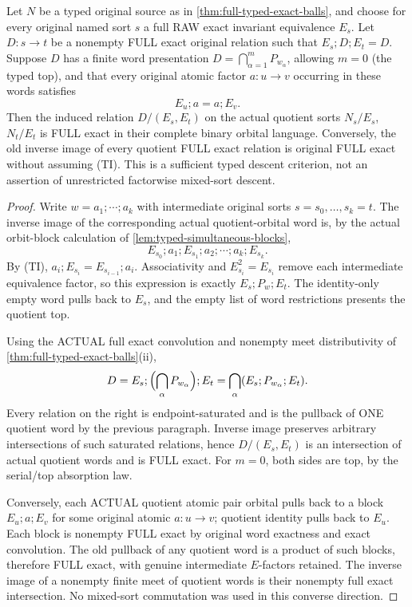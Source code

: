 \begin{lemma}
\label{lem:typed-intertwining-exact-descent}
Let $N$ be a typed original source as in
\cref{thm:full-typed-exact-balls}, and choose for every
original named sort $s$ a full RAW exact invariant
equivalence $E_s$.  Let $D:s\to t$ be a nonempty FULL
exact original relation such that $E_s;D;E_t=D$.
Suppose $D$ has a finite word presentation
$D=\bigcap_{\alpha=1}^m P_{w_\alpha}$, allowing $m=0$
(the typed top), and that every original atomic factor
$a:u\to v$ occurring in these words satisfies
\[
                       E_u;a=a;E_v.
 \tag{TI}\label{eq:typed-intertwining}
\]
Then the induced relation $D/(E_s,E_t)$ on the actual
quotient sorts $N_s/E_s$, $N_t/E_t$ is FULL exact in
their complete binary orbital language.  Conversely,
the old inverse image of every quotient FULL exact
relation is original FULL exact without assuming (TI).
This is a sufficient typed descent criterion, not an
assertion of unrestricted factorwise mixed-sort descent.
\end{lemma}
\begin{proof}
Write $w=a_1;\cdots;a_k$ with intermediate original
sorts $s=s_0,\ldots,s_k=t$.  The inverse image of
the corresponding actual quotient-orbital word is,
by the actual orbit-block calculation of
\cref{lem:typed-simultaneous-blocks},
\[
 E_{s_0};a_1;E_{s_1};a_2;\cdots;a_k;E_{s_k}.
\]
By (TI), $a_i;E_{s_i}=E_{s_{i-1}};a_i$.
Associativity and $E_{s_i}^2=E_{s_i}$ remove each
intermediate equivalence factor, so this expression is
exactly $E_s;P_w;E_t$.  The identity-only empty word
pulls back to $E_s$, and the empty list of word
restrictions presents the quotient top.

Using the ACTUAL full exact convolution and nonempty
meet distributivity of \cref{thm:full-typed-exact-balls}(ii),
\[
 D=E_s;\Bigl(\bigcap_\alpha P_{w_\alpha}\Bigr);E_t
       =\bigcap_\alpha(E_s;P_{w_\alpha};E_t).
\]
Every relation on the right is endpoint-saturated and
is the pullback of ONE quotient word by the previous
paragraph.  Inverse image preserves arbitrary
intersections of such saturated relations, hence
$D/(E_s,E_t)$ is an intersection of actual quotient
words and is FULL exact.  For $m=0$, both sides are
top, by the serial/top absorption law.

Conversely, each ACTUAL quotient atomic pair orbital
pulls back to a block $E_u;a;E_v$ for some original
atomic $a:u\to v$; quotient identity pulls back to
$E_u$.  Each block is nonempty FULL exact by original
word exactness and exact convolution.  The old pullback
of any quotient word is a product of such blocks,
therefore FULL exact, with genuine intermediate
$E$-factors retained.  The inverse image of a
nonempty finite meet of quotient words is their
nonempty full exact intersection.  No mixed-sort
commutation was used in this converse direction.
\end{proof}
